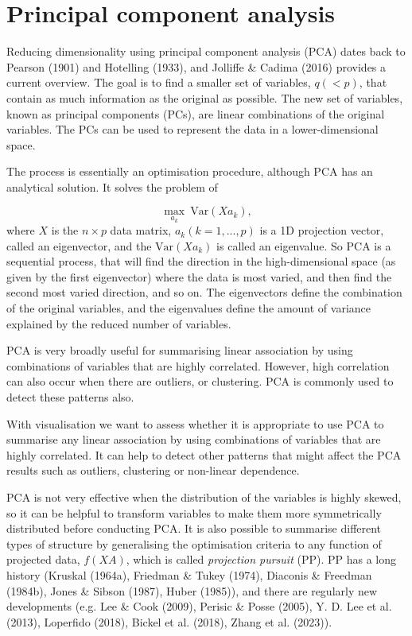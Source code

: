 \documentclass[
  letterpaper,
]{book}
\begin{document}
\hypertarget{principal-component-analysis}{%
\chapter{Principal component
analysis}\label{principal-component-analysis}}

Reducing dimensionality using principal component analysis (PCA) dates
back to Pearson (1901) and Hotelling (1933), and Jolliffe \& Cadima
(2016) provides a current overview. The goal is to find a smaller set of
variables, \(q (< p)\), that contain as much information as the original
as possible. The new set of variables, known as principal components
(PCs), are linear combinations of the original variables. The PCs can be
used to represent the data in a lower-dimensional space.

The process is essentially an optimisation procedure, although PCA has
an analytical solution. It solves the problem of

\[
\max_{a_k} ~\text{Var} (Xa_k),
\] where \(X\) is the \(n \times p\) data matrix, \(a_k (k=1, ..., p)\)
is a 1D projection vector, called an eigenvector, and the
\(\text{Var} (Xa_k)\) is called an eigenvalue. So PCA is a sequential
process, that will find the direction in the high-dimensional space (as
given by the first eigenvector) where the data is most varied, and then
find the second most varied direction, and so on. The eigenvectors
define the combination of the original variables, and the eigenvalues
define the amount of variance explained by the reduced number of
variables.

PCA is very broadly useful for summarising linear association by using
combinations of variables that are highly correlated. However, high
correlation can also occur when there are outliers, or clustering. PCA
is commonly used to detect these patterns also.

With visualisation we want to assess whether it is appropriate to use
PCA to summarise any linear association by using combinations of
variables that are highly correlated. It can help to detect other
patterns that might affect the PCA results such as outliers, clustering
or non-linear dependence.

PCA is not very effective when the distribution of the variables is
highly skewed, so it can be helpful to transform variables to make them
more symmetrically distributed before conducting PCA. It is also
possible to summarise different types of structure by generalising the
optimisation criteria to any function of projected data, \(f(XA)\),
which is called \emph{projection pursuit} (PP). PP has a long history
(Kruskal (1964a), Friedman \& Tukey (1974), Diaconis \& Freedman
(1984b), Jones \& Sibson (1987), Huber (1985)), and there are regularly
new developments (e.g. Lee \& Cook (2009), Perisic \& Posse (2005), Y.
D. Lee et al. (2013), Loperfido (2018), Bickel et al. (2018), Zhang et
al. (2023)).
\end{document}
